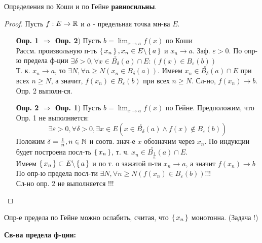 \begin{theorem}
Определения по Коши и по Гейне \textbf{равносильны}.
\end{theorem}
\begin{proof}
Пусть $f: E \rightarrow \mathbb{R}$ и $a$ - предельная точка мн-ва $E$.
\begin{itemize}
  \item [\textbf{Опр. 1 $\Rightarrow$ Опр. 2})] Пусть $b = \lim_{x\to a} f(x)$ по Коши \\ 

    Рассм. произвольную п-ть $\set{x_n}, x_n \in E \backslash \set{a}$ и $x_n \rightarrow a$. Заф. $\varepsilon > 0$. По опр-ю предела ф-ции $\exists \delta > 0, \forall x \in \overset{\circ}{B_{\delta}}(a) \cap E \colon (f(x) \in B_{\varepsilon}(b))$ \\

    Т. к. $x_n \rightarrow a$, то $\exists N, \forall n \geq N (x_n \in B_{\delta}(a))$. Имеем $x_n \in \overset{\circ}{B_{\delta}}(a) \cap E$ при всех $n \geq N$, а значит, $f(x_n) \in B_{\varepsilon}(b)$ при всех $n \geq N$. Сл-но, $f(x_n) \rightarrow b$. Опр. 2 выполн-ся.

  \item [\textbf{Опр. 2 $\Rightarrow$ Опр. 1})] Пусть $b = \lim_{x\to a} f(x)$ по Гейне. Предположим, что Опр. 1 не выполняется:
    \[
    \exists\varepsilon > 0, \forall \delta > 0, \exists x \in E (x \in \overset{\circ}{B_{\delta}}(a) \land f(x) \not\in B_{\varepsilon}(b))
    \]
    Положим $\delta = \frac{1}{n}, n \in \mathbb{N}$ и соотв. знач-е $x$ обозначим через $x_n$. По индукции будет построена посл-ть $\set{x_n}$, т. ч. $x_n \in \overset{\circ}{B_{\frac{1}{n}}}(a) \cap E$. \\

    Имеем $\set{x_n} \subset E \backslash \set{a}$ и по т. о зажатой п-ти $x_n \rightarrow a$, а значит $f(x_n) \rightarrow b$ \\

    По опр-ю предела посл-ти $\exists N, \forall n \geq N(f(x_n) \in B_{\varepsilon}(b))!!!$ \\

    Сл-но опр. 2 не выполняется !!!
\end{itemize}
\end{proof}
\begin{note}
  Опр-е предела по Гейне можно ослабить, считая, что $\set{x_n}$ монотонна. (Задача !)
\end{note}
\textbf{Св-ва предела ф-ции:} \\

